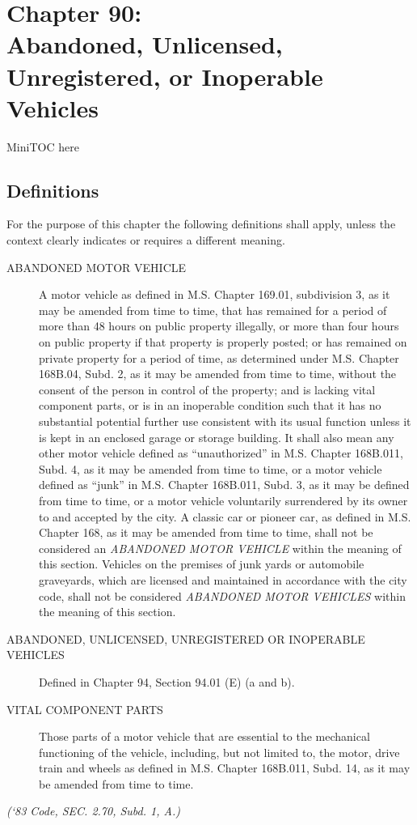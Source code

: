 %
\chapter*{Chapter 90: \\
	Abandoned, Unlicensed, Unregistered, or Inoperable Vehicles}

MiniTOC here
\pagebreak

\section{Definitions}
For the purpose of this chapter the following definitions shall apply, unless the context clearly indicates or requires a different meaning.
\begin{description}
\item[ABANDONED MOTOR VEHICLE] A motor vehicle as defined in M.S. Chapter 169.01, subdivision 3, as it may be amended from time to time, that has remained for a period of more than 48 hours on public property illegally, or more than four hours on public property if that property is properly posted; or has remained on private property for a period of time, as determined under M.S. Chapter 168B.04, Subd. 2, as it may be amended from time to time, without the consent of the person in control of the property; and is lacking vital component parts, or is in an inoperable condition such that it has no substantial potential further use consistent with its usual function unless it is kept in an enclosed garage or storage building.  It shall also mean any other motor vehicle defined as “unauthorized” in M.S. Chapter 168B.011, Subd. 4, as it may be amended from time to time, or a motor vehicle defined as “junk” in M.S. Chapter 168B.011, Subd. 3, as it may be defined from time to time, or a motor vehicle voluntarily surrendered by its owner to and accepted by the city.  A classic car or pioneer car, as defined in M.S. Chapter 168, as it may be amended from time to time, shall not be considered an \emph{ABANDONED MOTOR VEHICLE} within the meaning of this section.  Vehicles on the premises of junk yards or automobile graveyards, which are licensed and maintained in accordance with the city code, shall not be considered \emph{ABANDONED MOTOR VEHICLES} within the meaning of this section.
\item[ABANDONED, UNLICENSED, UNREGISTERED OR INOPERABLE VEHICLES] Defined in Chapter 94, Section 94.01 (E) (a and b).
\item[VITAL COMPONENT PARTS] Those parts of a motor vehicle that are essential to the mechanical functioning of the vehicle, including, but not limited to, the motor, drive train and wheels as defined in M.S. Chapter 168B.011, Subd. 14, as it may be amended from time to time.
\end{description}
\emph{(‘83 Code, SEC. 2.70, Subd. 1, A.)}

